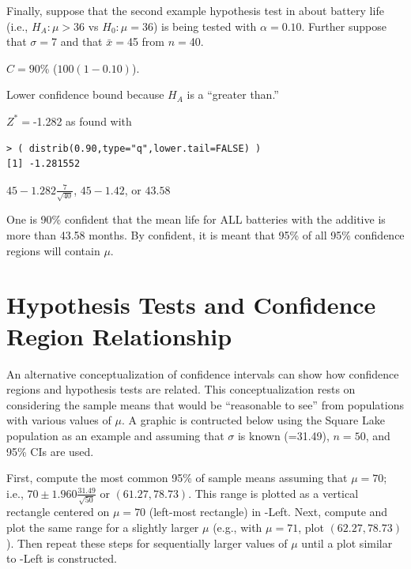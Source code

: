 \documentclass[10pt,openany]{book}\usepackage[]{graphicx}\usepackage[]{color}
\makeatletter
\newenvironment{kframe}{%
 \def\at@end@of@kframe{}%
 \ifinner\ifhmode%
  \def\at@end@of@kframe{\end{minipage}}%
  \begin{minipage}{\columnwidth}%
 \fi\fi%
 \def\FrameCommand##1{\hskip\@totalleftmargin \hskip-\fboxsep
 \colorbox{shadecolor}{##1}\hskip-\fboxsep
     \hskip-\linewidth \hskip-\@totalleftmargin \hskip\columnwidth}%
 \MakeFramed {\advance\hsize-\width
   \@totalleftmargin\z@ \linewidth\hsize
   \@setminipage}}%
 {\par\unskip\endMakeFramed%
 \at@end@of@kframe}
\newenvironment{knitrout}{}{} %
\makeatother
\begin{document}
Finally, suppose that the second example hypothesis test in  about battery life (i.e., $H_{A}:\mu>36$ vs $H_{0}:\mu=36$) is being tested with $\alpha=0.10$. Further suppose that $\sigma=$7 and that $\bar{x}=$45 from $n=$40.

\vspace*{-8pt}
\begin{Enumerate}
  \item $C=90$\% ($100(1-0.10)$).
  \item Lower confidence bound because $H_{A}$ is a ``greater than.''
  \item $Z^{*}=$-1.282 as found with
\begin{knitrout}
\color{fgcolor}\begin{kframe}
\begin{verbatim}
> ( distrib(0.90,type="q",lower.tail=FALSE) )
[1] -1.281552
\end{verbatim}
\end{kframe}
\end{knitrout}
\vspace*{6pt}
  \item $45-1.282\frac{7}{\sqrt{40}}$, $45-1.42$, or $43.58$
  \item One is 90\% confident that the mean life for ALL batteries with the additive is more than 43.58 months. By confident, it is meant that 95\% of all 95\% confidence regions will contain $\mu$.
\end{Enumerate}


\section[Inference Type Relationship]{Hypothesis Tests and Confidence Region Relationship}
An alternative conceptualization of confidence intervals can show how confidence regions and hypothesis tests are related. This conceptualization rests on considering the sample means that would be ``reasonable to see'' from populations with various values of $\mu$. A graphic is contructed below using the Square Lake population as an example and assuming that $\sigma$ is known (=31.49), $n=50$, and 95\% CIs are used.

First, compute the most common 95\% of sample means assuming that $\mu=70$; i.e., $70 \pm 1.960\frac{31.49}{\sqrt{50}}$ or $(61.27,78.73)$. This range is plotted as a vertical rectangle centered on $\mu=70$ (left-most rectangle) in -Left. Next, compute and plot the same range for a slightly larger $\mu$ (e.g., with $\mu=71$, plot $(62.27,78.73)$). Then repeat these steps for sequentially larger values of $\mu$ until a plot similar to -Left is constructed.
\end{document}
